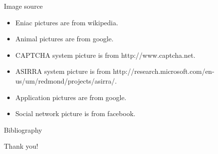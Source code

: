 \documentclass[first=purple,second=dgreen,logo=redexc]{aaltoslides}
\begin{document}
{\begin{frame}{Image source}
	\begin{itemize}
		\item Eniac pictures are from wikipedia.
		\item Animal pictures are from google.
		\item CAPTCHA system picture is from http://www.captcha.net.
		\item ASIRRA system picture is from http://research.microsoft.com/en-us/um/redmond/projects/asirra/.
		\item Application pictures are from google.
		\item Social network picture is from facebook.
	\end{itemize}
\end{frame}

\begin{frame}[allowframebreaks]{Bibliography}
%

 
\end{frame}



\begin{frame}{}
	\begin{center}
		\large
		Thank you!
	\end{center}
\end{frame}

}
\end{document}
